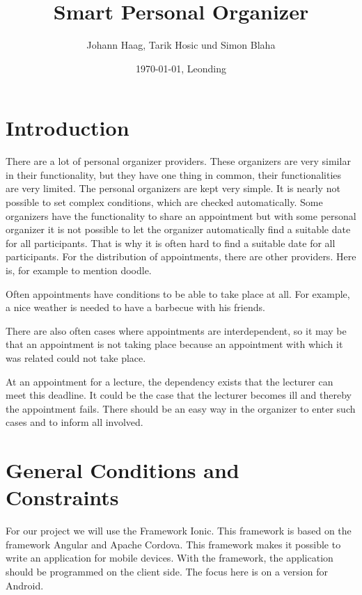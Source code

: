 \documentclass[12pt]{scrartcl}
\title{Smart Personal Organizer}
\author{Johann Haag, Tarik Hosic und Simon Blaha}
\date{\today{}, Leonding}
\begin{document}
    \maketitle
    \pagebreak
    \tableofcontents
    \pagebreak

    \section{Introduction}
    
        There are a lot of personal organizer providers. 
        These organizers are very similar in their functionality, but they have one thing in common, 
        their functionalities are very limited. The personal organizers are kept very simple. It is
        nearly not possible to set complex conditions, which are checked automatically.  
        Some organizers have the functionality to share an appointment but 
        with some personal organizer it is not possible to let the organizer automatically find a suitable date for all participants.
        That is why it is often hard to find a suitable date for all participants.
        For the distribution of appointments, there are other providers. Here is, for example
        to mention doodle.

        Often appointments have conditions to be able to take place at all. 
        For example, a nice weather is needed to have a barbecue with his friends. 

        There are also often cases where appointments are interdependent, 
        so it may be that an appointment is not taking place because an appointment with 
        which it was related could not take place.
        
        At an appointment for a lecture, the dependency exists that the lecturer
        can meet this deadline. It could be the case that the lecturer becomes ill
        and thereby the appointment fails.
        There should be an easy way in the organizer to enter such cases and
        to inform all involved.
        \pagebreak

    \section{General Conditions and Constraints}
        For our project we will use the Framework Ionic. This framework is based on the framework Angular and Apache Cordova.
        This framework makes it possible to write an application for mobile devices. With the framework, the application should be programmed on the client side.
        The focus here is on a version for Android.
\end{document}
